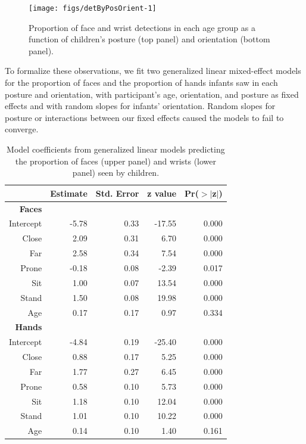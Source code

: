 \documentclass[10pt, letterpaper]{article}
\newenvironment{CodeChunk}{}{}
\begin{document}
\begin{CodeChunk}
\begin{figure}[h]

{\centering \texttt{[image: figs/detByPosOrient-1]} 

}

\caption[Proportion of face and wrist detections in each age group as a function of children's posture (top panel) and orientation (bottom panel)]{Proportion of face and wrist detections in each age group as a function of children's posture (top panel) and orientation (bottom panel).}\label{fig:detByPosOrient}
\end{figure}
\end{CodeChunk}

To formalize these observations, we fit two generalized linear
mixed-effect models for the proportion of faces and the proportion of
hands infants saw in each posture and orientation, with participant's
age, orientation, and posture as fixed effects and with random slopes
for infants' orientation. Random slopes for posture or interactions
between our fixed effects caused the models to fail to converge.

\begin{table}[ht]
\centering
\begin{tabular}{rrrrr}
  \hline
 & Estimate & Std. Error & z value & Pr($>$$|$z$|$) \\ 
  \hline
  \textbf{Faces} \\
Intercept & -5.78 & 0.33 & -17.55 & 0.000 \\ 
  Close & 2.09 & 0.31 & 6.70 & 0.000 \\ 
  Far & 2.58 & 0.34 & 7.54 & 0.000 \\ 
  Prone & -0.18 & 0.08 & -2.39 & 0.017 \\ 
  Sit & 1.00 & 0.07 & 13.54 & 0.000 \\ 
  Stand & 1.50 & 0.08 & 19.98 & 0.000 \\ 
  Age & 0.17 & 0.17 & 0.97 & 0.334 \\ 
  \hline
  \textbf{Hands} \\
  Intercept & -4.84 & 0.19 & -25.40 & 0.000 \\ 
  Close & 0.88 & 0.17 & 5.25 & 0.000 \\ 
  Far & 1.77 & 0.27 & 6.45 & 0.000 \\ 
  Prone & 0.58 & 0.10 & 5.73 & 0.000 \\ 
  Sit & 1.18 & 0.10 & 12.04 & 0.000 \\ 
  Stand & 1.01 & 0.10 & 10.22 & 0.000 \\ 
  Age & 0.14 & 0.10 & 1.40 & 0.161 \\ 
   \hline
\end{tabular}
\caption{Model coefficients from generalized linear models predicting the proportion of faces (upper panel) and wrists (lower panel) seen by children.} 
\vspace{-1em}
\end{table}
\end{document}
